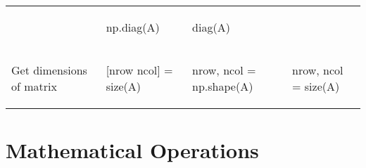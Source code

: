 \documentclass[10pt, landscape]{article}
\newenvironment{Shaded}{}{}
\newcommand{\OperatorTok}[1]{\textcolor[rgb]{0.40,0.40,0.40}{{#1}}}
\newcommand{\NormalTok}[1]{{#1}}
\begin{document}
\begin{multicols*}{2}
\begin{tabular}[ ]{@{}llll@{}}
\begin{minipage}[t]{0.23\columnwidth}
\begin{Shaded}
\end{Shaded}
\strut
\end{minipage} & \begin{minipage}[t]{0.23\columnwidth}\raggedright\strut
\begin{Shaded}
\begin{Highlighting}[]
\NormalTok{np.diag(A)}
\end{Highlighting}
\end{Shaded}
\strut
\end{minipage} & \begin{minipage}[t]{0.20\columnwidth}\raggedright\strut
\begin{Shaded}
\begin{Highlighting}[]
\NormalTok{diag(A)}
\end{Highlighting}
\end{Shaded}
\strut
\end{minipage}\tabularnewline
\begin{minipage}[t]{0.23\columnwidth}\raggedright\strut
Get dimensions of matrix\strut
\end{minipage} & \begin{minipage}[t]{0.23\columnwidth}\raggedright\strut
\begin{Shaded}
\begin{Highlighting}[]
\NormalTok{[nrow ncol] = size(A)}
\end{Highlighting}
\end{Shaded}
\strut
\end{minipage} & \begin{minipage}[t]{0.23\columnwidth}\raggedright\strut
\begin{Shaded}
\begin{Highlighting}[]
\NormalTok{nrow, ncol }\OperatorTok{=} \NormalTok{np.shape(A)}
\end{Highlighting}
\end{Shaded}
\strut
\end{minipage} & \begin{minipage}[t]{0.20\columnwidth}\raggedright\strut
\begin{Shaded}
\begin{Highlighting}[]
\NormalTok{nrow, ncol = size(A)}
\end{Highlighting}
\end{Shaded}
\strut
\end{minipage}\tabularnewline
\bottomrule
\end{tabular}

\section{Mathematical Operations}\label{mathematical-operations}


\end{multicols*}
\end{document}
